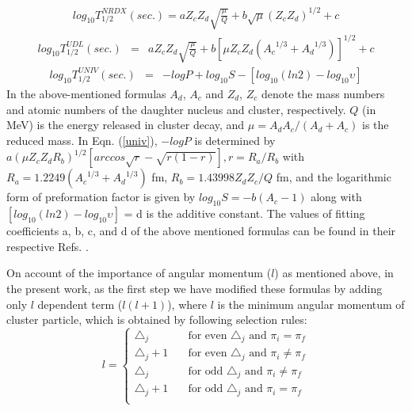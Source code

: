 \documentclass[preprint,10pt]{elsarticle}
\begin{document}
 \begin{eqnarray}
    log_{10}T_{1/2}^{NRDX}(sec.) = aZ_{c}Z_{d}\sqrt{\frac{\mu}{Q}} + b\sqrt{\mu}(Z_{c}Z_{d})^{1/2} + c
     \label{eqnrdx}
     \end{eqnarray}
    \begin{eqnarray}
    log_{10}T_{1/2}^{UDL}(sec.) &=& aZ_{c}Z_{d}\sqrt{\frac{\mu}{Q}}+b[\mu Z_{c}Z_{d}({A_{c}}^{1/3} + {A_{d}}^{1/3})]^{1/2}+c
    \label{udl}
    \end{eqnarray}
     \begin{eqnarray}
     log_{10}T_{1/2}^{UNIV}(sec.) &=& -log P+log_{10}S -[log_{10}(ln2)-log_{10}{\upsilon}]
    \label{univ}
    \end{eqnarray}
  In the above-mentioned formulas $A_{d}$, $A_{c}$ and $Z_{d}$, $Z_{c}$ denote the mass numbers and atomic numbers of the daughter nucleus and cluster, respectively. $Q$ (in MeV) is the energy released in cluster decay, and $\mu = A_{d}A_{c}/(A_{d}+A_{c})$ is the reduced mass. In Eqn. (\ref{univ}), $-log P$ is determined by $a(\mu  Z_{c}Z_{d} R_{b})^{1/2}[arccos\sqrt{r} - \sqrt{r(1-r)} ], r = R_{a}/R_{b}$ with $R_{a} = 1.2249( {A_{c}}^{1/3}+{A_{d}}^{1/3})$ fm, $R_{b} = 1.43998Z_{d}Z_{c}/Q$ fm, and the logarithmic form of preformation factor is given by $log_{10}S = -b(A_{c}-1)$ along with $[log_{10}(ln2)-log_{10}{\upsilon}]$ = d is the additive constant. The values of fitting coefficients a, b, c, and d of the above mentioned formulas can be found in their respective Refs. \cite{balasubramaniam2004,rena2004,horoi2004,nrdx2008,udl2009,univ2011}. \par
  On account of the importance of angular momentum ($l$) as mentioned above, in the present work, as the first step we have modified these formulas by adding only $l$ dependent term ($l(l+1)$), where $l$ is the minimum angular momentum of cluster particle, which is obtained by following selection rules:
\begin{equation}
   l=\left\{
    \begin{array}{ll}
       \triangle_j\,\,\,\,\,\,
       &\mbox{for even}\,\,\triangle_j\,\,\mbox{and}\,\,\pi_{i} = \pi_{f}\\
       \triangle_{j}+1\,\,\,\,\,\,
       &\mbox{for even}\,\,\triangle_j\,\,\mbox{and}\,\,\pi_{i} \neq \pi_{f}\\
       \triangle_{j}\,\,\,\,\,\,
       &\mbox{for odd}\,\,\triangle_j\,\,\mbox{and}\,\,\pi_{i} \neq \pi_{f}\\
       \triangle_{j}+1\,\,\,\,\,\,
       &\mbox{for odd}\,\,\triangle_j\,\,\mbox{and}\,\,\pi_{i} = \pi_{f}\\
      \end{array}\right.
      \label{lmin}
\end{equation}
\end{document}
